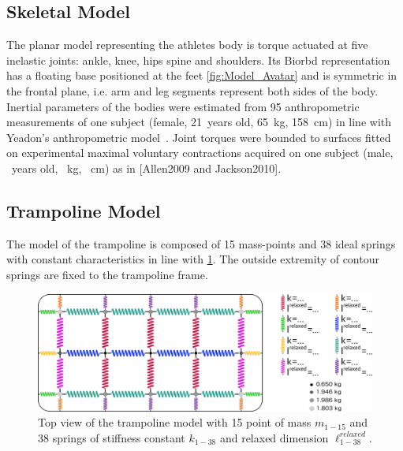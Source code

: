 \subsection{Skeletal Model}\label{subsec:2a}
The planar model representing the athletes body is torque actuated at five inelastic joints: ankle, knee, hips spine and shoulders.
Its Biorbd \cite{michaudBiorbd2021} representation has a floating base positioned at the feet \ref{fig:Model_Avatar} and is symmetric in the frontal plane, i.e. arm and leg segments represent both sides of the body.
Inertial parameters of the bodies were estimated from 95 anthropometric measurements of one subject (female, 21~years old, 65~kg, 158~cm) in line with Yeadon's anthropometric model~\cite{yeadon1990simulation}.
Joint torques were bounded to surfaces fitted on experimental maximal voluntary contractions acquired on one subject (male, ~years old, ~kg, ~cm)  as in [Allen2009 and Jackson2010].



\subsection{Trampoline Model}\label{subsec:2b}
The model of the trampoline is composed of 15 mass-points and 38 ideal springs with constant characteristics in line with \cite{jacques2008determining} \ref{fig:Model_Toile}.
The outside extremity of contour springs are fixed to the trampoline frame.


\begin{figure}[h!]
\centering
\includegraphics[width=\linewidth]{figures/Model_Toile.png}
\caption{Top view of the trampoline model with 15 point of mass $m_{1-15}$ and 38 springs of stiffness constant $k_{1-38}$ and relaxed dimension ${\ell}^{relaxed}_{1-38}$.}
\label{fig:Model_Toile}
\end{figure}


